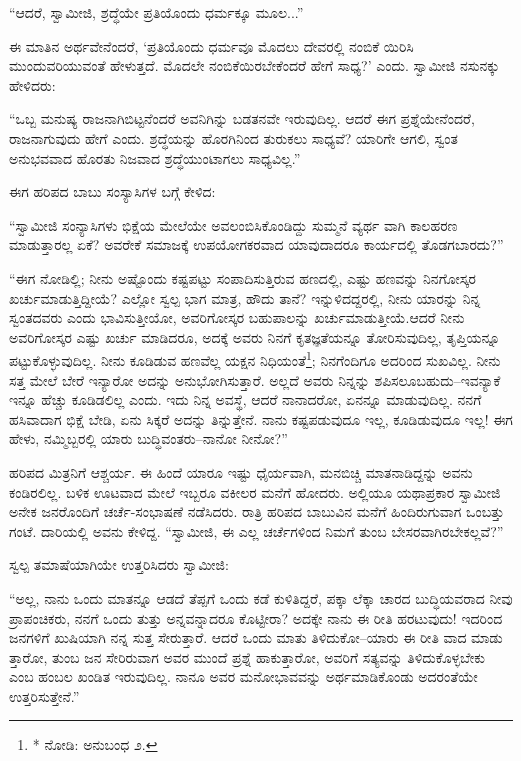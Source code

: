 “ಆದರೆ, ಸ್ವಾಮೀಜಿ, ಶ್ರದ್ಧೆಯೇ ಪ್ರತಿಯೊಂದು ಧರ್ಮಕ್ಕೂ ಮೂಲ...”

ಈ ಮಾತಿನ ಅರ್ಥವೇನೆಂದರೆ, ‘ಪ್ರತಿಯೊಂದು ಧರ್ಮವೂ ಮೊದಲು ದೇವರಲ್ಲಿ ನಂಬಿಕೆ ಯಿರಿಸಿ ಮುಂದುವರಿಯುವಂತೆ ಹೇಳುತ್ತದೆ. ಮೊದಲೇ ನಂಬಿಕೆಯಿರಬೇಕೆಂದರೆ ಹೇಗೆ ಸಾಧ್ಯ?’ ಎಂದು. ಸ್ವಾಮೀಜಿ ನಸುನಕ್ಕು ಹೇಳಿದರು:

“ಒಬ್ಬ ಮನುಷ್ಯ ರಾಜನಾಗಿಬಿಟ್ಟನೆಂದರೆ ಅವನಿಗಿನ್ನು ಬಡತನವೇ ಇರುವುದಿಲ್ಲ. ಆದರೆ ಈಗ ಪ್ರಶ್ನೆಯೇನೆಂದರೆ, ರಾಜನಾಗುವುದು ಹೇಗೆ ಎಂದು. ಶ್ರದ್ಧೆಯನ್ನು ಹೊರಗಿನಿಂದ ತುರುಕಲು ಸಾಧ್ಯವೆ? ಯಾರಿಗೇ ಆಗಲಿ, ಸ್ವಂತ ಅನುಭವವಾದ ಹೊರತು ನಿಜವಾದ ಶ್ರದ್ಧೆಯುಂಟಾಗಲು ಸಾಧ್ಯವಿಲ್ಲ.”

ಈಗ ಹರಿಪದ ಬಾಬು ಸಂಸ್ಯಾಸಿಗಳ ಬಗ್ಗೆ ಕೇಳಿದ:

“ಸ್ವಾಮೀಜಿ ಸಂನ್ಯಾಸಿಗಳು ಭಿಕ್ಷೆಯ ಮೇಲೆಯೇ ಅವಲಂಬಿಸಿಕೊಂಡಿದ್ದು ಸುಮ್ಮನೆ ವ್ಯರ್ಥ ವಾಗಿ ಕಾಲಹರಣ ಮಾಡುತ್ತಾರಲ್ಲ ಏಕೆ? ಅವರೇಕೆ ಸಮಾಜಕ್ಕೆ ಉಪಯೋಗಕರವಾದ ಯಾವುದಾದರೂ ಕಾರ್ಯದಲ್ಲಿ ತೊಡಗಬಾರದು?”

“ಈಗ ನೋಡಿಲ್ಲಿ; ನೀನು ಅಷ್ಟೊಂದು ಕಷ್ಟಪಟ್ಟು ಸಂಪಾದಿಸುತ್ತಿರುವ ಹಣದಲ್ಲಿ, ಎಷ್ಟು ಹಣವನ್ನು ನಿನಗೋಸ್ಕರ ಖರ್ಚುಮಾಡುತ್ತಿದ್ದೀಯೆ? ಎಲ್ಲೋ ಸ್ವಲ್ಪ ಭಾಗ ಮಾತ್ರ, ಹೌದು ತಾನೆ? ಇನ್ನುಳಿದದ್ದರಲ್ಲಿ, ನೀನು ಯಾರನ್ನು ನಿನ್ನ ಸ್ವಂತದವರು ಎಂದು ಭಾವಿಸುತ್ತೀಯೋ, ಅವರಿಗೋಸ್ಕರ ಬಹುಪಾಲನ್ನು ಖರ್ಚುಮಾಡುತ್ತೀಯೆ.ಆದರೆ ನೀನು ಅವರಿಗೋಸ್ಕರ ಎಷ್ಟು ಖರ್ಚು ಮಾಡಿದರೂ, ಅದಕ್ಕೆ ಅವರು ನಿನಗೆ ಕೃತಜ್ಞತೆಯನ್ನೂ ತೋರಿಸುವುದಿಲ್ಲ, ತೃಪ್ತಿಯನ್ನೂ ಪಟ್ಟುಕೊಳ್ಳುವುದಿಲ್ಲ. ನೀನು ಕೂಡಿಡುವ ಹಣವೆಲ್ಲ ಯಕ್ಷನ ನಿಧಿಯಂತೆ\footnote{* ನೋಡಿ: ಅನುಬಂಧ ೨.}; ನಿನಗೆಂದಿಗೂ ಅದರಿಂದ ಸುಖವಿಲ್ಲ. ನೀನು ಸತ್ತ ಮೇಲೆ ಬೇರೆ ಇನ್ಯಾರೋ ಅದನ್ನು ಅನುಭೋಗಿಸುತ್ತಾರೆ. ಅಲ್ಲದೆ ಅವರು ನಿನ್ನನ್ನು ಶಪಿಸಲೂಬಹುದು–ಇವನ್ಯಾಕೆ ಇನ್ನೂ ಹೆಚ್ಚು ಕೂಡಿಡಲಿಲ್ಲ ಎಂದು. ಇದು ನಿನ್ನ ಅವಸ್ಥೆ, ಆದರೆ ನಾನಾದರೋ, ಏನನ್ನೂ ಮಾಡುವುದಿಲ್ಲ. ನನಗೆ ಹಸಿವಾದಾಗ ಭಿಕ್ಷೆ ಬೇಡಿ, ಏನು ಸಿಕ್ಕರೆ ಅದನ್ನು ತಿನ್ನುತ್ತೇನೆ. ನಾನು ಕಷ್ಟಪಡುವುದೂ ಇಲ್ಲ, ಕೂಡಿಡುವುದೂ ಇಲ್ಲ! ಈಗ ಹೇಳು, ನಮ್ಮಿಬ್ಬರಲ್ಲಿ ಯಾರು ಬುದ್ಧಿವಂತರು–ನಾನೋ ನೀನೋ?”

ಹರಿಪದ ಮಿತ್ರನಿಗೆ ಆಶ್ಚರ್ಯ. ಈ ಹಿಂದೆ ಯಾರೂ ಇಷ್ಟು ಧೈರ್ಯವಾಗಿ, ಮನಬಿಚ್ಚಿ ಮಾತನಾಡಿದ್ದನ್ನು ಅವನು ಕಂಡಿರಲಿಲ್ಲ. ಬಳಿಕ ಊಟವಾದ ಮೇಲೆ ಇಬ್ಬರೂ ವಕೀಲರ ಮನೆಗೆ ಹೋದರು. ಅಲ್ಲಿಯೂ ಯಥಾಪ್ರಕಾರ ಸ್ವಾಮೀಜಿ ಅನೇಕ ಜನರೊಂದಿಗೆ ಚರ್ಚೆ-ಸಂಭಾಷಣೆ ನಡೆಸಿದರು. ರಾತ್ರಿ ಹರಿಪದ ಬಾಬುವಿನ ಮನೆಗೆ ಹಿಂದಿರುಗುವಾಗ ಒಂಬತ್ತು ಗಂಟೆ. ದಾರಿಯಲ್ಲಿ ಅವನು ಕೇಳಿದ್ದ. “ಸ್ವಾಮೀಜಿ, ಈ ಎಲ್ಲ ಚರ್ಚೆಗಳಿಂದ ನಿಮಗೆ ತುಂಬ ಬೇಸರವಾಗಿರಬೇಕಲ್ಲವೆ?”

ಸ್ವಲ್ಪ ತಮಾಷೆಯಾಗಿಯೇ ಉತ್ತರಿಸಿದರು ಸ್ವಾಮೀಜಿ:

“ಅಲ್ಲ, ನಾನು ಒಂದು ಮಾತನ್ನೂ ಆಡದೆ ತೆಪ್ಪಗೆ ಒಂದು ಕಡೆ ಕುಳಿತಿದ್ದರೆ, ಪಕ್ಕಾ ಲೆಕ್ಕಾ ಚಾರದ ಬುದ್ಧಿಯವರಾದ ನೀವು ಪ್ರಾಪಂಚಿಕರು, ನನಗೆ ಒಂದು ತುತ್ತು ಅನ್ನವನ್ನಾದರೂ ಕೊಟ್ಟೀರಾ? ಅದಕ್ಕೇ ನಾನು ಈ ರೀತಿ ಹರಟುವುದು! ಇದರಿಂದ ಜನಗಳಿಗೆ ಖುಷಿಯಾಗಿ ನನ್ನ ಸುತ್ತ ಸೇರುತ್ತಾರೆ. ಆದರೆ ಒಂದು ಮಾತು ತಿಳಿದುಕೋ–ಯಾರು ಈ ರೀತಿ ವಾದ ಮಾಡು ತ್ತಾರೋ, ತುಂಬ ಜನ ಸೇರಿರುವಾಗ ಅವರ ಮುಂದೆ ಪ್ರಶ್ನೆ ಹಾಕುತ್ತಾರೋ, ಅವರಿಗೆ ಸತ್ಯವನ್ನು ತಿಳಿದುಕೊಳ್ಳಬೇಕು ಎಂಬ ಹಂಬಲ ಖಂಡಿತ ಇರುವುದಿಲ್ಲ. ನಾನೂ ಅವರ ಮನೋಭಾವವನ್ನು ಅರ್ಥಮಾಡಿಕೊಂಡು ಅದರಂತೆಯೇ ಉತ್ತರಿಸುತ್ತೇನೆ.”

